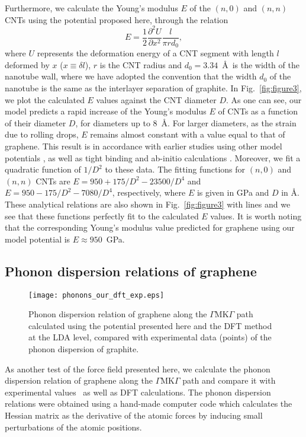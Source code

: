 \documentclass[aps,prb,floatfix,twocolumn,showpacs]{revtex4}
\begin{document}
Furthermore, we calculate the Young's modulus $E$ of the $(n,0)$ and $(n,n)$ CNTs
using the potential proposed here, through the relation
\begin{equation} 
E=\frac{1}{2} \frac{\partial^2 U}{\partial x^2} \frac{l}{\pi r d_0},
\end{equation}
where $U$ represents the deformation energy of a CNT segment with length $l$
deformed by $x$ ($x \equiv \delta l$), $r$ is the CNT radius and $d_0=3.34$~\AA\  is the width of the 
nanotube wall, where we have adopted  the convention that the width $d_0$
of the nanotube is the same as the interlayer separation  of graphite.
In Fig.~\ref{fig:figure3}, we plot the calculated $E$ values against the CNT diameter $D$.
As one can see, our model predicts a rapid increase of the Young's modulus $E$ of CNTs
as a function of their diameter $D$, for diameters up to 8~\AA. For larger diameters, 
as the strain due to rolling drops, $E$ remains almost constant with a value
equal to that of graphene. This result is 
in accordance with earlier studies using other model potentials 
\cite{Meo, Chang, Popov}, as well as tight binding \cite{Goze} and ab-initio  calculations \cite{Rubio}.
Moreover, we fit a quadratic function of $1/D^2$ to these data. The fitting functions for $(n,0)$ and $(n,n)$
CNTs are  $E=950+175 /D^2-23500/D^4$ and $E=950-175/D^2-7080/D^4$, respectively, where
$E$ is given in GPa and $D$ in \AA. These analytical relations are also shown in Fig.~\ref{fig:figure3}
with lines and we see that these functions perfectly fit to the calculated $E$ values.
It is worth noting that the corresponding Young's modulus
value predicted for graphene using our model potential is $E \approx 950$~GPa.

\subsection{Phonon dispersion relations of graphene\label{sec:phonons}}

\begin{figure}[!tb]
\texttt{[image: phonons\_our\_dft\_exp.eps]}
\caption{Phonon dispersion relation of graphene along the 
$\Gamma$MK$\Gamma$ path calculated using the potential presented here
and the DFT method at the LDA level, compared with experimental data (points) of the phonon dispersion 
of graphite\cite{mohr,maultzch}.}
\label{fig:figure4}
\end{figure}


As another test of the force field presented here, we calculate 
the phonon dispersion relation of graphene along the $\Gamma$MK$\Gamma$ path
and compare it with experimental values~\cite{mohr,maultzch} as well as DFT calculations. 
The phonon dispersion relations were obtained using a hand-made computer code which
calculates the Hessian matrix
as the derivative of the atomic forces by inducing small perturbations of the atomic
positions.
\end{document}
